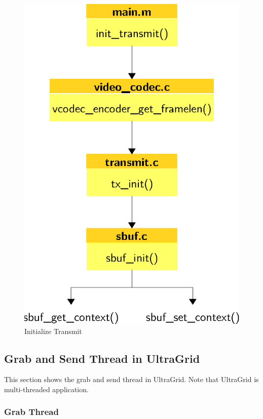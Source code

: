 \begin{figure}[!h]
\begin{center}
\includegraphics[scale=.6]{./img/ultra-init-trans}
\caption{\label{fig:ultra-init-trans}Initialize Transmit}
\end{center}
\end{figure}


\subsection{\label{ssec:ultra-grab-send}Grab and Send Thread in UltraGrid}

This section shows the grab and send thread in UltraGrid. Note that UltraGrid is
multi-threaded application.

\subsubsection{\label{sssec:ultra-grab}Grab Thread}

